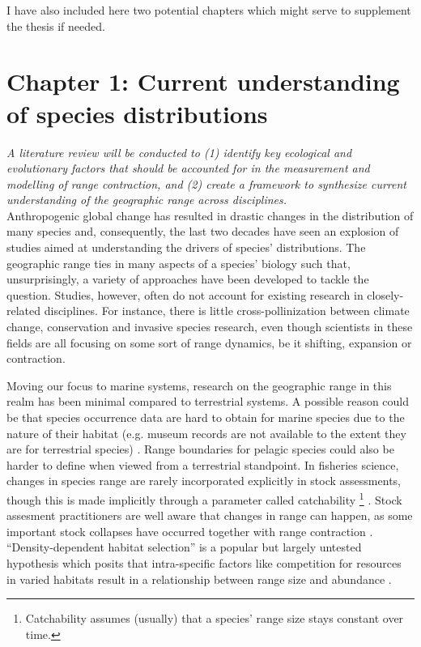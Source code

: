 \documentclass{article}
\begin{document}
I have also included here two potential chapters which
might serve to supplement the thesis if needed.\\


\newpage
\section*{Chapter 1: Current understanding of species distributions}
\addtocounter{section}{1}

\emph{A literature review will be conducted to (1) identify key
  ecological and evolutionary factors that should be accounted for
  in the measurement and modelling of range contraction, and (2)
  create a framework to synthesize current understanding of the
  geographic range across disciplines.}
\\

Anthropogenic global change has resulted in drastic changes in the
distribution of many species and, consequently, the last
two decades have seen an explosion of studies aimed at understanding
the drivers of species' distributions. The geographic
range ties in many aspects of a species' biology such that,
unsurprisingly, a variety of approaches have been developed to tackle
the question. Studies, however, often do not account for existing research in
closely-related disciplines. For instance, there is little
cross-pollinization between climate change, conservation and invasive
species research, even though scientists in these fields are all
focusing on some sort of range dynamics, be it shifting, expansion or
contraction.

Moving our focus to marine systems, research on the geographic range
in this realm has been minimal compared to terrestrial
systems. A possible reason could be that species occurrence data are hard to obtain for marine
species due to the nature of their habitat (e.g. museum
records are not available to the extent they are for terrestrial
species) \citep[see][]{Tyberghein2012_a}. Range boundaries for
pelagic species could also be harder to define when viewed from a
 terrestrial standpoint. In fisheries science, changes in species range
 are rarely incorporated explicitly in stock assessments, though this
 is made implicitly through a parameter called catchability
 \footnote{Catchability assumes (usually) that a species' range size stays constant
over time.} \citep{Winters1985_a}. Stock assesment practitioners are
well aware that changes in range can happen, as some
important stock collapses have occurred together with range contraction
\citep[][]{Rose1999_a}.
``Density-dependent habitat selection'' is a popular but largely untested
hypothesis \citep{MacCall1990_a} which posits that intra-specific factors like
competition for resources in varied habitats result in a relationship between
range size and abundance \citep[but see][]{Shepherd2004_a}.
\end{document}
